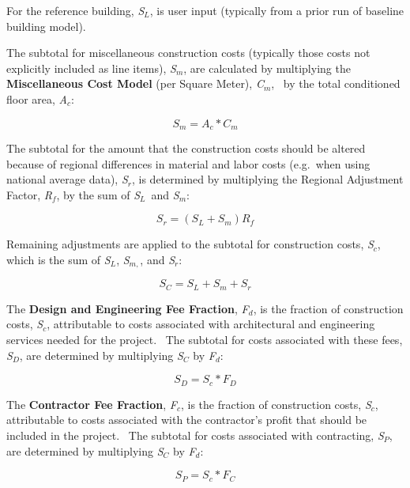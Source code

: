 For the reference building, \emph{S\(_{L}\)}, is user input (typically from a prior run of baseline building model).

The subtotal for miscellaneous construction costs (typically those costs not explicitly included as line items), \emph{S\(_{m}\)}, are calculated by multiplying the \textbf{Miscellaneous Cost Model} (per Square Meter), \emph{C\(_{m}\)},~ by the total conditioned floor area, \emph{A\(_{c}\)}:

\begin{equation}
{S_m} = {A_c} * {C_m}
\end{equation}

The subtotal for the amount that the construction costs should be altered because of regional differences in material and labor costs (e.g.~when using national average data), \emph{S\(_{r}\)}, is determined by multiplying the Regional Adjustment Factor, \emph{R\(_{f}\)}, by the sum of \emph{S\(_{L}\)}~and \emph{S\(_{m}\)}:

\begin{equation}
{S_r} = ({S_L} + {S_m}){R_f}
\end{equation}

Remaining adjustments are applied to the subtotal for construction costs, \emph{S\(_{c}\)}, which is the sum of \emph{S\(_{L}\)}, \emph{S\(_{m,}\)}, and \emph{S\(_{r}\)}:

\begin{equation}
{S_C} = {S_L} + {S_m} + {S_r}
\end{equation}

The \textbf{Design and Engineering Fee Fraction}, \emph{F\(_{d}\)}, is the fraction of construction costs, \emph{S\(_{c}\)}, attributable to costs associated with architectural and engineering services needed for the project.~ The subtotal for costs associated with these fees, \emph{S\(_{D}\)}, are determined by multiplying \emph{S\(_{C}\)} by \emph{F\(_{d}\)}:

\begin{equation}
{S_D} = {S_c}*{F_D}
\end{equation}

The \textbf{Contractor Fee Fraction}, \emph{F\(_{c}\)}, is the fraction of construction costs, \emph{S\(_{c}\)}, attributable to costs associated with the contractor's profit that should be included in the project.~ The subtotal for costs associated with contracting, \emph{S\(_{P}\)}, are determined by multiplying \emph{S\(_{C}\)} by \emph{F\(_{d}\)}:

\begin{equation}
{S_P} = {S_c}*{F_C}
\end{equation}

